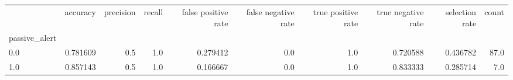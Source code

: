 \begin{tabular}{lrrrrrrrrr}
\toprule
{} &  accuracy &  precision &  recall &  false positive rate &  false negative rate &  true positive rate &  true negative rate &  selection rate &  count \\
passive\_alert &           &            &         &                      &                      &                     &                     &                 &        \\
\midrule
0.0           &  0.781609 &        0.5 &     1.0 &             0.279412 &                  0.0 &                 1.0 &            0.720588 &        0.436782 &   87.0 \\
1.0           &  0.857143 &        0.5 &     1.0 &             0.166667 &                  0.0 &                 1.0 &            0.833333 &        0.285714 &    7.0 \\
\bottomrule
\end{tabular}
